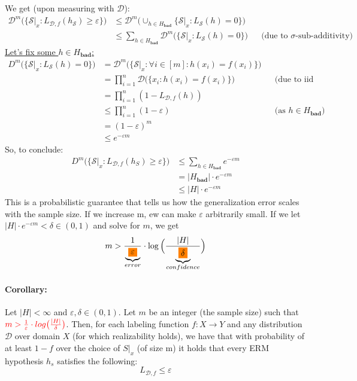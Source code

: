 \documentclass[10pt,a4paper]{article}
\theoremstyle{definition}
\theoremstyle{plain}
\begin{document}
We get (upon measuring with $\mathcal{D}$):
\begin{align*}
\mathcal{D}^m \big( \{\mathcal{S}|_x : L_{\mathcal{D},f}(h_\mathcal{S}) \geq \varepsilon\}\big) &\leq \mathcal{D}^m\big( \cup_{h \in H_{\mathrm{\textbf{bad}}}}\{\mathcal{S}|_x : L_{\mathcal{S}}(h) = 0\} \big)\\
&\leq \sum_{h \in H_{\mathrm{\textbf{bad}}}} \mathcal{D}^m \big(\{\mathcal{S}|_x : L_{\mathcal{S}}(h) = 0\}\big) && \text{(due to $\sigma$-sub-additivity)}
\end{align*}
\underline{Let's fix some $h \in H_{\mathrm{\textbf{bad}}}$:}
\begin{align*}
	D^m \big(\{\mathcal{S}|_x : L_{\mathcal{S}}(h) = 0\}\big) &= \mathcal{D}^m \big(\{\mathcal{S}|_x : \forall i \in [m]: h(x_i) = f(x_i)\}\big)\\
	&= \prod_{i = 1}^{n} \mathcal{D} \big(\{x_i: h(x_i) = f(x_i)\}\big) && \text{(due to iid assumption)}\\
	&= \prod_{i=1}^{n} (1 - L_{\mathcal{D},f}(h))\\
	&\leq \prod_{i=1}^{n} (1-\varepsilon) && \text{(as $h \in H_{\mathrm{\textbf{bad}}}$)}\\
	&= (1-\varepsilon)^m \\
	&\leq e^{-\varepsilon m}
\end{align*}
So, to conclude:
\begin{align*}
	D^m \big(\{\mathcal{S}|_x : L_{\mathcal{D},f}(h_S) \geq \varepsilon\}\big) &\leq \sum_{h \in H_{\mathrm{\textbf{bad}}}} e^{-\varepsilon m} \\ 
	&= |H_{\mathrm{\textbf{bad}}}| \cdot e^{-\varepsilon m} \\
	&\leq |H| \cdot e^{-\varepsilon m}
\end{align*}
This is a probabilistic guarantee that tells us how the generalization error scales with the sample size. If we increase m, ew can make $\varepsilon$ arbitrarily small. 
If we let $ |H| \cdot e^{-\varepsilon m} <\delta \in (0,1)$ and solve for $m$, we get 
$$ m>\frac{1}{\underbrace{\colorbox{orange}{$\varepsilon$}}_{error}} \cdot \log \Big(\frac{|H|}{\underbrace{\colorbox{orange}{$\delta$}}_{confidence}}\Big)$$
\paragraph{Corollary:} Let $|H| < \infty$ and $\varepsilon, \delta \in (0,1)$. Let $m$ be an integer (the sample size) such that $\color{red} m>\frac{1}{\varepsilon} \cdot log \big(\frac{|H|}{\delta}\big)$. Then, for each labeling function $f: X \to Y$ and any distribution $\mathcal{D}$ over domain $X$ (for which realizability holds), we have that with probability of at least $1-f$ over the choice of $S|_x$ (of size m) it holds that every ERM hypothesis $h_s$ satisfies the following:
$$ L_{\mathcal{D},f} \leq \varepsilon $$
\end{document}
